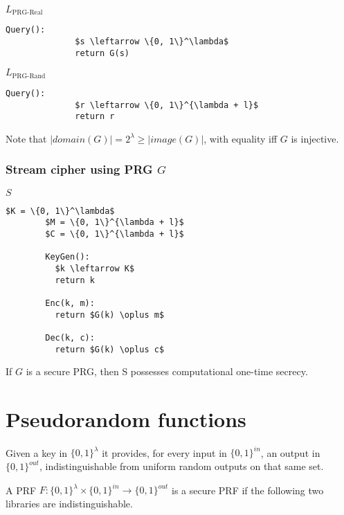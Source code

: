 \documentclass[a4paper]{scrreprt}
\begin{document}
\begin{tcbraster}[raster columns=2,raster equal height,nobeforeafter,raster column skip=2cm]
	\begin{library}{$L_{\text{PRG-Real}}$}
		\begin{lstlisting}[mathescape=true,autogobble=true]
			Query():
			  $s \leftarrow \{0, 1\}^\lambda$
			  return G(s)
		\end{lstlisting}
	\end{library}
	\begin{library}{$L_{\text{PRG-Rand}}$}
		\begin{lstlisting}[mathescape=true,autogobble=true]
			Query():
			  $r \leftarrow \{0, 1\}^{\lambda + l}$
			  return r
		\end{lstlisting}
	\end{library}
\end{tcbraster}

Note that $|domain(G)| = 2^\lambda \geq |image(G)|$, with equality iff $G$ is injective.

\subsection{Stream cipher using PRG $G$}

\begin{library}{$S$}
	\begin{lstlisting}[mathescape=true,autogobble=true]
		$K = \{0, 1\}^\lambda$
		$M = \{0, 1\}^{\lambda + l}$
		$C = \{0, 1\}^{\lambda + l}$

		KeyGen():
		  $k \leftarrow K$
		  return k

		Enc(k, m):
		  return $G(k) \oplus m$

		Dec(k, c):
		  return $G(k) \oplus c$
	\end{lstlisting}
\end{library}

If $G$ is a secure PRG, then S possesses computational one-time secrecy.


\chapter{Pseudorandom functions}

Given a key in $\{0, 1\}^\lambda$ it provides, for every input in $\{0,
1\}^{in}$, an output in $\{0, 1\}^{out}$, indistinguishable from uniform random
outputs on that same set.

A PRF $F: \{0, 1\}^\lambda \times \{0, 1\}^{in} \rightarrow \{0, 1\}^{out}$ is
a secure PRF if the following two libraries are indistinguishable.
\end{document}
